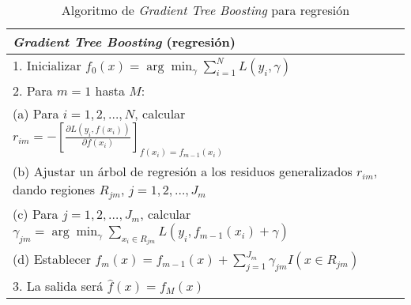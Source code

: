 \begin{table}[H]
\centering
\begin{tabular}{l}
\toprule\toprule
\textbf{\textit{Gradient Tree Boosting} (regresión)} \\
\midrule\midrule
1. Inicializar $f_0(x) = \arg\min_\gamma \sum_{i=1}^{N} L(y_i, \gamma)$ \\
2. Para $m = 1$ hasta $M$: \\
\quad (a) Para $i = 1, 2, \dots, N$, calcular $\displaystyle r_{im} = -\left[\frac{\partial L(y_i, f(x_i))}{\partial f(x_i)}\right]_{f(x_i) = f_{m-1}(x_i)}$ \\
\makecell[l]{\quad (b) Ajustar un árbol de regresión a los residuos generalizados $r_{im}$, dando regiones \\ \quad \quad \; $R_{jm}$, $j = 1, 2, \dots, J_m$} \\
\quad (c) Para $j = 1, 2, \dots, J_m$, calcular $\displaystyle \gamma_{jm} = \arg\min_\gamma \sum_{x_i \in R_{jm}} L(y_i, f_{m-1}(x_i) + \gamma)$ \\
\quad (d) Establecer $\displaystyle f_m(x) = f_{m-1}(x) + \sum_{j=1}^{J_m} \gamma_{jm} I(x \in R_{jm})$ \\
3. La salida será $\displaystyle \hat{f}(x) = f_M(x)$ \\
\bottomrule\bottomrule
\end{tabular}
\caption{Algoritmo de \textit{Gradient Tree Boosting} para regresión}
\label{tb:10.3}
\end{table}

